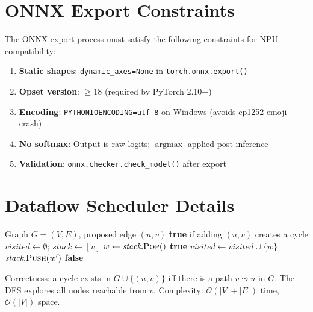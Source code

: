 \documentclass[11pt,a4paper,twoside]{article}
\theoremstyle{definition}
\theoremstyle{remark}
\newcommand{\BigO}{\mathcal{O}}
\newcommand{\argmax}{\operatorname{argmax}}
\begin{document}
\appendix

\section{ONNX Export Constraints}
\label{app:onnx}

The ONNX export process must satisfy the following constraints for NPU compatibility:

\begin{enumerate}
  \item \textbf{Static shapes}: \texttt{dynamic\_axes=None} in \texttt{torch.onnx.export()}
  \item \textbf{Opset version}: $\geq 18$ (required by PyTorch 2.10+)
  \item \textbf{Encoding}: \texttt{PYTHONIOENCODING=utf-8} on Windows (avoids cp1252 emoji crash)
  \item \textbf{No softmax}: Output is raw logits; $\argmax$ applied post-inference
  \item \textbf{Validation}: \texttt{onnx.checker.check\_model()} after export
\end{enumerate}

\section{Dataflow Scheduler Details}
\label{app:dataflow-details}

\begin{algorithm}[H]
\caption{\textsc{WouldCreateCycle}: DFS-based cycle detection before adding edge}
\label{alg:cycle}
\begin{algorithmic}[1]
\Require Graph $G = (V, E)$, proposed edge $(u, v)$
\Ensure \textbf{true} if adding $(u, v)$ creates a cycle
\State $\textit{visited} \gets \emptyset$; $\textit{stack} \gets [v]$
  \State $w \gets \textit{stack}.\textsc{Pop}()$
   \Return \textbf{true} \EndIf
    \State $\textit{visited} \gets \textit{visited} \cup \{w\}$
     $\textit{stack}.\textsc{Push}(w')$ \EndFor
  \EndIf
\EndWhile
\State \Return \textbf{false}
\end{algorithmic}
\end{algorithm}

Correctness: a cycle exists in $G \cup \{(u,v)\}$ iff there is a path $v \leadsto u$ in $G$. The DFS explores all nodes reachable from $v$. Complexity: $\BigO(|V| + |E|)$ time, $\BigO(|V|)$ space.
\end{document}
